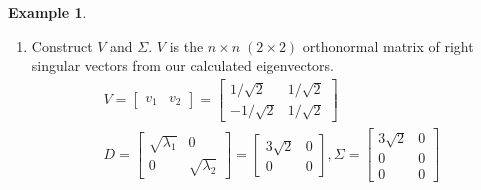 \documentclass[12pt, reqno]{amsart}
\theoremstyle{definition}
\newtheorem{example}[theorem]{Example}
\theoremstyle{remark}
\numberwithin{equation}{section}
\begin{document}
\begin{example}
\begin{enumerate}
\begin{equation}
\begin{split}
                        \begin{array}{c|c}
                        A^TA - 0I & 0
                        \end{array}
                    \right]
                    \sim\
                    \left[
                        \begin{array}{c|c}
                        I & v_2
                        \end{array}
                    \right],
                    v_2 = \begin{bmatrix}
                        1/\sqrt{2}\\
                        1\sqrt{2}
                    \end{bmatrix}\\
                \end{split}
            \end{equation}
        \item Construct $V$ and $\Sigma$. $V$ is the $n \times n \; (2 \times 2)$  orthonormal matrix of right singular vectors from our calculated eigenvectors.
            \begin{equation}
                \begin{split}
                    V = \begin{bmatrix}
                        v_1 & v_2
                    \end{bmatrix}
                    = \begin{bmatrix}
                        1/\sqrt{2} & 1/\sqrt{2}\\
                        -1/\sqrt{2} & 1/\sqrt{2}
                    \end{bmatrix}\\
                    D = \begin{bmatrix}
                        \sqrt{\lambda_1} & 0\\
                        0 & \sqrt{\lambda_2}
                    \end{bmatrix}
                    = \begin{bmatrix}
                        3\sqrt{2} & 0\\
                        0 & 0
                    \end{bmatrix},
                    \Sigma = \begin{bmatrix}
                        3\sqrt{2} & 0\\
                        0 & 0\\
                        0 & 0

\end{bmatrix}
\end{split}
\end{equation}
\end{enumerate}
\end{example}
\end{document}
